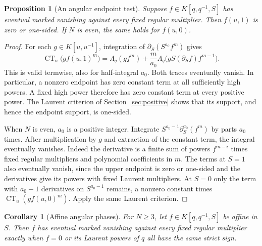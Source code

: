 \documentclass[11pt]{article}
\newtheorem{proposition}[theorem]{Proposition}
\newtheorem{corollary}[theorem]{Corollary}
\newcommand{\CT}{\operatorname{CT}}
\newcommand{\Lq}{\Lambda_q}
\begin{document}
\begin{proposition}[An angular endpoint test]\label{prop:angular-endpoints}
Suppose \(f\in K[q,q^{-1},S]\) has eventual marked vanishing against
every fixed regular multiplier. Then \(f(u,1)\) is zero or one-sided.
If \(N\) is even, the same holds for \(f(u,0)\).
\end{proposition}

\begin{proof}
For each \(g\in K[u,u^{-1}]\), integration of
\(\partial_S(S^{a_0}f^m)\) gives
\[
 \CT_u\bigl(g f(u,1)^m\bigr)=
 \Lq(g f^m)+\frac{m}{a_0}\Lq\bigl(g S(\partial_S f)f^{m-1}\bigr).
\]
This is valid termwise, also for half-integral \(a_0\).
Both traces eventually vanish. In particular, a nonzero endpoint
has zero constant term at all sufficiently high powers. A fixed
high power therefore has zero constant term at every positive
power. The Laurent criterion of Section~\ref{sec:positive} shows
that its support, and hence the endpoint support, is one-sided.

When \(N\) is even, \(a_0\) is a positive integer. Integrate
\(S^{a_0-1}\partial_S^{a_0}(f^m)\) by parts \(a_0\) times.
After multiplication by \(g\) and extraction of the constant term,
the integral eventually vanishes. Indeed the derivative is a
finite sum of powers \(f^{m-i}\) times fixed regular multipliers
and polynomial coefficients in \(m\). The terms at \(S=1\)
also eventually vanish, since the upper endpoint is zero or
one-sided and the derivatives give its powers with fixed Laurent
multipliers. At \(S=0\) only the term with \(a_0-1\) derivatives
on \(S^{a_0-1}\) remains, a nonzero constant times
\(\CT_u(g f(u,0)^m)\). Apply the same Laurent criterion.
\end{proof}

\begin{corollary}[Affine angular phases]\label{cor:affine-angular}
For \(N\ge3\), let \(f\in K[q,q^{-1},S]\) be affine in \(S\).
Then \(f\) has eventual marked vanishing against every fixed regular
multiplier exactly when \(f=0\) or its Laurent powers of \(q\) all
have the same strict sign.
\end{corollary}
\end{document}
